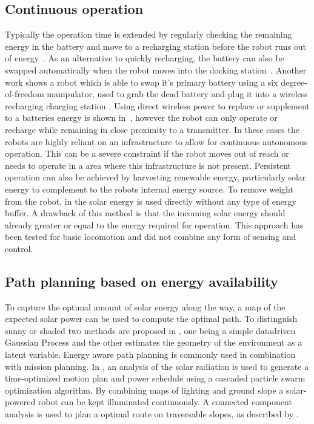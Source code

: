 \documentclass[letterpaper, 10 pt, conference]{ieeeconf}  %
\begin{document}
\subsection{Continuous operation} 

Typically the operation time is extended by regularly checking the remaining energy in the battery and move to a recharging station before the robot runs out of energy~\cite{pickem_icra_2015, rubenstein_icra_2012}.
As an alternative to quickly recharging, the battery can also be swapped automatically when the robot moves into the docking station~\cite{kemal_mech_2015}.
Another work shows a robot which is able to swap it's primary battery using a six degree-of-freedom manipulator, used to grab the dead battery and plug it into a wireless recharging charging station \cite{zhang_conel_2013}.
Using direct wireless power to replace or supplement to a batteries energy is shown in~\cite{karpelson_icra_2014}, however the robot can only operate or recharge while remaining in close proximity to a transmitter. 
In these cases the robots are highly reliant on an infrastructure to allow for continuous autonomous operation.
This can be a severe constraint if the robot moves out of reach or needs to operate in a area where this infrastructure is not present. Persistent operation can also be achieved by harvesting renewable energy, particularly solar energy to complement to the robots internal energy source. To remove weight from the robot, in \cite{bruhwiler_iros_2015} the solar energy is used directly without any type of energy buffer. A drawback of this method is that the incoming solar energy should already greater or equal to the energy required for operation. This approach has been tested for basic locomotion and did not combine any form of sensing and control.

\subsection{Path planning based on energy availability}

To capture the optimal amount of solar energy along the way, a map of the expected solar power can be used to compute the optimal path. To distinguish sunny or shaded two methods are proposed in \cite{plonski_tranro_2016}, one being a simple datadriven Gaussian Process and the other estimates the geometry of the environment as a latent variable.
Energy aware path planning is commonly used in combination with mission planning.
In \cite{kaplan_iros_2016}, an analysis of the solar radiation is used to generate a time-optimized motion plan and power schedule using a cascaded particle swarm optimization algorithm.
By combining maps of lighting and ground slope a solar-powered robot can be kept illuminated continuously. A connected component analysis is used to plan a optimal route on traversable slopes, as described by \cite{otten_icra_2015}.
\end{document}
